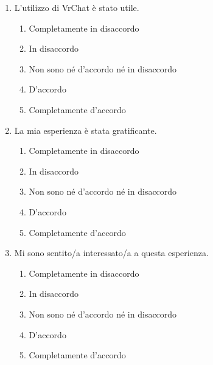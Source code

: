\documentclass{article}
\newcommand{\app}{VrChat \hspace{0.1em}}
\begin{document}
\begin{enumerate}[label=\textbf{Domanda \arabic*.}, resume]
    \item L’utilizzo di \app è stato utile.
    \begin{enumerate}
    \item Completamente in disaccordo
    \item In disaccordo
    \item Non sono né d’accordo né in disaccordo
    \item D’accordo
    \item Completamente d’accordo
\end{enumerate}
    \item La mia esperienza è stata gratificante.
    \begin{enumerate}
    \item Completamente in disaccordo
    \item In disaccordo
    \item Non sono né d’accordo né in disaccordo
    \item D’accordo
    \item Completamente d’accordo
\end{enumerate}
    \item Mi sono sentito/a interessato/a a questa esperienza.
    \begin{enumerate}
    \item Completamente in disaccordo
    \item In disaccordo
    \item Non sono né d’accordo né in disaccordo
    \item D’accordo
    \item Completamente d’accordo
\end{enumerate}
\end{enumerate}
\end{document}
